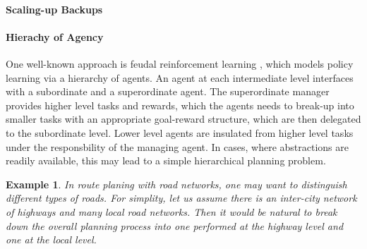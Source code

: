 \documentclass{article}
\newtheorem{example}{Example}
\begin{document}
\paragraph{Scaling-up Backups}



\paragraph{Hierachy of Agency}

One well-known approach is feudal reinforcement learning \cite{dayan1993feudal}, which models policy learning via a  hierarchy of agents. An agent at each intermediate level interfaces with a subordinate and a superordinate agent. The superordinate manager provides higher level tasks and rewards, which the agents needs to break-up into smaller tasks with an appropriate goal-reward structure, which are then delegated to the subordinate level. Lower level agents are insulated from higher level tasks under the responsbility of the managing agent. In cases, where abstractions are readily available, this may lead to a simple hierarchical planning problem.
\begin{example}
In route planing with road networks, one may want to distinguish different types of roads. For simplity, let us assume there is an inter-city network of highways and many local road networks. Then it would be natural to break down the overall planning process into one performed at the highway level and one at the local level. 
\end{example}



\newpage
 





\end{document}

